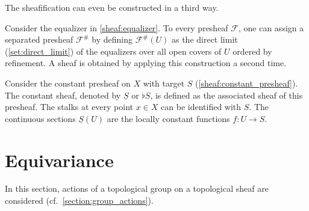 
    The sheafification can even be constructed in a third way.
    \begin{construct}\label{sheaf:colimit_construction}
        Consider the equalizer in \cref{sheaf:equalizer}. To every presheaf $\mathcal{F}$, one can assign a separated presheaf $\mathcal{F}^\#$ by defining $\mathcal{F}^\#(U)$ as the direct limit (\cref{set:direct_limit}) of the equalizers over all open covers of $U$ ordered by refinement. A sheaf is obtained by applying this construction a second time.
    \end{construct}

    \begin{example}\label{sheaf:constant_sheaf}
        Consider the constant presheaf on $X$ with target $S$ (\cref{sheaf:constant_presheaf}). The constant sheaf, denoted by $\underline{S}$ or $\flat S$, is defined as the associated sheaf of this presheaf. The stalks at every point $x\in X$ can be identified with $S$. The continuous sections $\underline{S}(U)$ are the locally constant functions $f:U\rightarrow S$.
    \end{example}

\section{Equivariance}

    In this section, actions of a topological group on a topological sheaf are considered (cf.~\cref{section:group_actions}).

